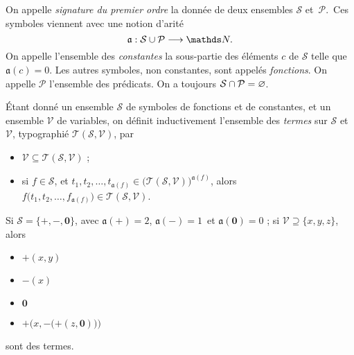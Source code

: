 \begin{defn}
	On appelle \textit{signature du premier ordre} la donnée de deux ensembles $\mathcal{S}$\/ et~$\mathcal{P}$.\footnotemark\ Ces symboles viennent avec une notion d'arité \[
		\mathfrak{a} : \mathcal{S} \cup \mathcal{P} \longrightarrow \N
	.\] On appelle l'ensemble des \textit{constantes} la sous-partie des éléments $c$\/ de $\mathcal{S}$\/ telle que $\mathfrak{a}(c) = 0$. Les autres symboles, non constantes, sont appelés \textit{fonctions}.
	On appelle $\mathcal{P}$\/ l'ensemble des prédicats.
	On a toujours $\mathcal{S} \cap \mathcal{P} = \varnothing$.
\end{defn}

\begin{defn}
	Étant donné un ensemble $\mathcal{S}$\/ de symboles de fonctions et de constantes, et un ensemble $\mathcal{V}$ de variables, on définit inductivement l'ensemble des \textit{termes} sur $\mathcal{S}$\/ et $\mathcal{V}$, typographié $\mathcal{T}(\mathcal{S}, \mathcal{V})$, par
	\begin{itemize}
		\item $\mathcal{V} \subseteq \mathcal{T}(\mathcal{S}, \mathcal{V})$\/ ;
		\item si $f \in \mathcal{S}$, et $t_1, t_2, \ldots, t_{\mathfrak{a}(f)} \in \big(\mathcal{T}(\mathcal{S}, \mathcal{V})\big)^{\mathfrak{a}(f)}$, alors $f\big(t_1, t_2, \ldots, f_{\mathfrak{a}(f)}\big) \in \mathcal{T}(\mathcal{S}, \mathcal{V})$.
	\end{itemize}
\end{defn}

\begin{exm}
	Si $\mathcal{S} = \{\mathbf{+}, \mathbf{-},\mathbf{0}\}$, avec $\mathfrak{a}(\mathbf{+}) = 2$, $\mathfrak{a}(\mathbf{-}) = 1$\footnotemark\ et $\mathfrak{a}(\mathbf{0}) = 0$ ; si $\mathcal{V} \supseteq \{x,y,z\}$, alors
	\begin{itemize}
		\item $\mathbf{+}(x,y)$\/
		\item $\mathbf{-}(x)$\/ 
		\item $\mathbf{0}$
		\item $\mathbf{+}\Big(x, \mathbf{-}\big(\mathbf{+}(z, \mathbf{0})\big)\Big)$\/
	\end{itemize}
	sont des termes.
\end{exm}


